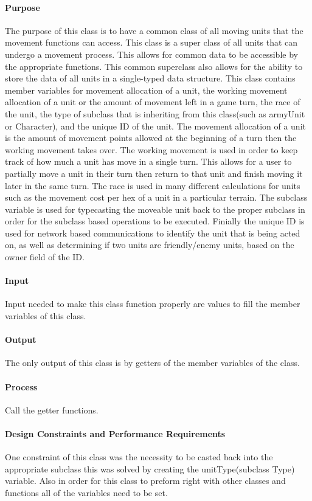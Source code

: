 \documentclass[12pt,a4paper,titlepage]{article}
\begin{document}
\paragraph{Purpose} The purpose of this class is to have a common class of all moving units that the movement functions can access. This class is a super class of all units that can undergo a movement process. This allows for common data to be accessible by the appropriate functions. This common superclass also allows for the ability to store the data of all units in a single-typed data structure. This class contains member variables for movement allocation of a unit, the working movement allocation of a unit or the amount of movement left in a game turn, the race of the unit, the type of subclass that is inheriting from this class(such as armyUnit or Character), and the unique ID of the unit. The movement allocation of a unit is the amount of movement points allowed at the beginning of a turn then the working movement takes over. The working movement is used in order to keep track of how much a unit has move in a single turn. This allows for a user to partially move a unit in their turn then return to that unit and finish moving it later in the same turn. The race is used in many different calculations for units such as the movement cost per hex of a unit in a particular terrain. The subclass variable is used for typecasting the moveable unit back to the proper subclass in order for the subclass based operations to be executed. Finially the unique ID is used for network based communications to identify the unit that is being acted on, as well as determining if two units are friendly/enemy units, based on the owner field of the ID. 
\paragraph{Input} Input needed to make this class function properly are values to fill the member variables of this class. 
\paragraph{Output} The only output of this class is by getters of the member variables of the class. 
\paragraph{Process} Call the getter functions.
\paragraph{Design Constraints and Performance Requirements} One constraint of this class was the necessity to be casted back into the appropriate subclass this was solved by creating the unitType(subclass Type) variable. Also in order for this class to preform right with other classes and functions all of the variables need to be set. 
	
\end{document}
